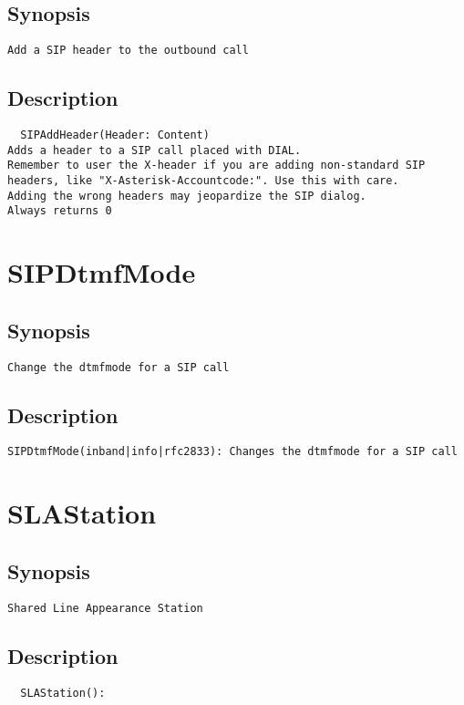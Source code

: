 \subsection{Synopsis}
\begin{verbatim}
Add a SIP header to the outbound call
\end{verbatim}
\subsection{Description}
\begin{verbatim}
  SIPAddHeader(Header: Content)
Adds a header to a SIP call placed with DIAL.
Remember to user the X-header if you are adding non-standard SIP
headers, like "X-Asterisk-Accountcode:". Use this with care.
Adding the wrong headers may jeopardize the SIP dialog.
Always returns 0

\end{verbatim}


\section{SIPDtmfMode}
\subsection{Synopsis}
\begin{verbatim}
Change the dtmfmode for a SIP call
\end{verbatim}
\subsection{Description}
\begin{verbatim}
SIPDtmfMode(inband|info|rfc2833): Changes the dtmfmode for a SIP call

\end{verbatim}


\section{SLAStation}
\subsection{Synopsis}
\begin{verbatim}
Shared Line Appearance Station
\end{verbatim}
\subsection{Description}
\begin{verbatim}
  SLAStation():

\end{verbatim}


